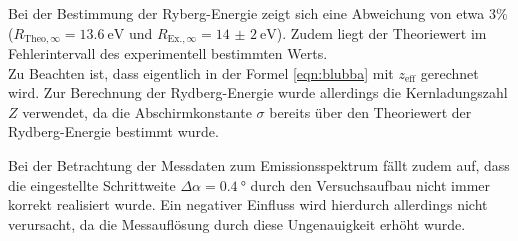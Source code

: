 Bei der Bestimmung der Ryberg-Energie zeigt sich eine Abweichung von etwa $3\%$ ($R_{\mathrm{Theo},\infty}=\SI{13.6}{\electronvolt}$ und $R_{\mathrm{Ex.},\infty}=\SI{14(2)}{\electronvolt}$). Zudem liegt der Theoriewert im Fehlerintervall des experimentell bestimmten Werts.\\
Zu Beachten ist, dass eigentlich in der Formel \eqref{eqn:blubba} mit $z_\mathrm{eff}$ gerechnet wird. Zur Berechnung der Rydberg-Energie wurde allerdings die Kernladungszahl $Z$ verwendet, da die Abschirmkonstante $\sigma$ bereits über den Theoriewert der Rydberg-Energie bestimmt wurde.

Bei der Betrachtung der Messdaten zum Emissionsspektrum fällt zudem auf, dass die eingestellte Schrittweite $\Delta \alpha=\SI{0.4}{\degree}$ durch den Versuchsaufbau nicht immer korrekt realisiert wurde. Ein negativer Einfluss wird hierdurch allerdings nicht verursacht, da die Messauflösung durch diese Ungenauigkeit erhöht wurde.
